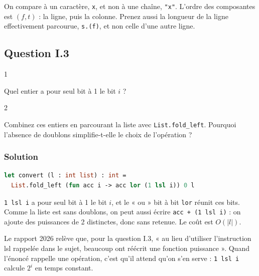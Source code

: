 \documentclass[11pt,a4paper]{article}
\begin{document}
\begin{piege}

On compare à un caractère, \texttt{\textquotesingle{}x\textquotesingle{}}, et non à une chaîne, \texttt{"x"}. L'ordre des composantes est \((f,t)\) : la ligne, puis la colonne. Prenez aussi la longueur de la ligne effectivement parcourue, \texttt{s.(f)}, et non celle d'une autre ligne.

\end{piege}

\hypertarget{question-i.3}{%
\subsection{Question I.3}\label{question-i.3}}

\begin{indication}{1}

Quel entier a pour seul bit à 1 le bit \(i\) ?

\end{indication}

\begin{indication}{2}

Combinez ces entiers en parcourant la liste avec \texttt{List.fold\_left}. Pourquoi l'absence de doublons simplifie-t-elle le choix de l'opération ?

\end{indication}

\hypertarget{solution-2}{%
\subsubsection{Solution}\label{solution-2}}

\begin{lstlisting}[language=Caml]
let convert (l : int list) : int =
  List.fold_left (fun acc i -> acc lor (1 lsl i)) 0 l
\end{lstlisting}

\texttt{1\ lsl\ i} a pour seul bit à 1 le bit \(i\), et le « ou » bit à bit \texttt{lor} réunit ces bits. Comme la liste est sans doublons, on peut aussi écrire \texttt{acc\ +\ (1\ lsl\ i)} : on ajoute des puissances de 2 distinctes, donc sans retenue. Le coût est \(O(|l|)\).

\begin{jury}

Le rapport 2026 relève que, pour la question I.3, « au lieu d'utiliser l'instruction lsl rappelée dans le sujet, beaucoup ont réécrit une fonction puissance ». Quand l'énoncé rappelle une opération, c'est qu'il attend qu'on s'en serve : \texttt{1\ lsl\ i} calcule \(2^i\) en temps constant.

\end{jury}
\end{document}
